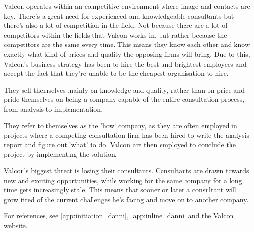 \label{app:valcon_environment}
Valcon operates within an competitive environment where image and contacts are key. 
There's a great need for experienced and knowledgeable consultants but there's also a lot of competition in the field.
Not because there are a lot of competitors within the fields that Valcon works in, but rather because the competitors are the same every time.
This means they know each other and know exactly what kind of prices and quality the opposing firms will bring.
Due to this, Valcon's business strategy has been to hire the best and brightest employees and accept the fact that they're unable to be the cheapest organisation to hire.

They sell themselves mainly on knowledge and quality, rather than on price and pride themselves on being a company capable of the entire consultation process, from analysis to implementation.

They refer to themselves as the 'how' company, as they are often employed in projects where a competing consultation firm has been hired to write the analysis report and figure out 'what' to do. 
Valcon are then employed to conclude the project by implementing the solution.

Valcon's biggest threat is losing their consultants.
Consultants are drawn towards new and exciting opportunities, while working for the same company for a long time gets increasingly stale.
This means that sooner or later a consultant will grow tired of the current challenges he's facing and move on to another company.

For references, see \ref{app:initiation_danni}, \ref{app:inline_danni} and the Valcon website.
